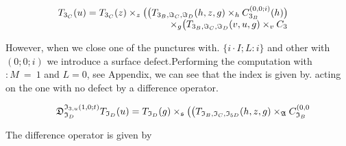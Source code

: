 \documentclass{article}
\begin{document}
\begin{equation}
\begin{array} { r l } { T _ { 3 _ { C } } ( u ) = T _ { 3 _ { C } } ( z ) \times _ { z } \big ( \big ( T _ { 3 _ { B }, \Im _ { C }, \Im _ { D } } ( h, z, g ) \times _ { h } C _ { 3 _ { B } } ^ { ( 0, 0 ; i ) } ( h ) \big ) } & { } \\ { \times _ { g } \big ( T _ { 3 _ { B }, \Im _ { C }, \Im _ { D } } ( v, u, g ) \times _ { v } C _ { 3 _ {}}}\end{array}
\end{equation}


However, when we close one of the punctures with. $\{ i \cdot I ; L \colon i \}$ and other with
$( 0 ; 0 ; i )$ we introduce a surface defect.Performing the computation with
$: M ~ = ~ 1$ and $L = 0$, see Appendix, we can see that the index is given by.
acting on the one with no defect by a difference operator.


\begin{equation}
\begin{array} { r l } & { \mathfrak { D } _ { \mathfrak { I } _ { D } } ^ { \mathfrak { I } _ { 3, u } ( 1, 0 ; t ) } T _ { \mathfrak { I } _ { D } } ( u ) = T _ { \mathfrak { I } _ { D } } ( g ) \times _ { \mathfrak { s } } \big ( \big ( T _ { \mathfrak { I } _ { B }, \mathfrak { I } _ { C }, \mathfrak { I } _ { 5 D } } ( h, z, g ) \times _ { \mathfrak { A } } C _ { \mathfrak { I } _ { B } } ^ { ( 0, 0}}\end{array}
\end{equation}


The difference operator is given by
\end{document}
